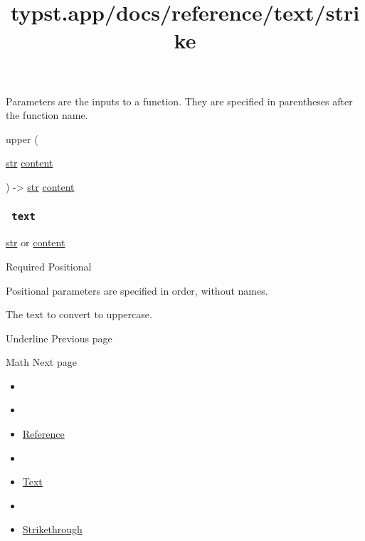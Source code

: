 \label{parameters-tooltip}
Parameters are the inputs to a function. They are specified in
parentheses after the function name.

{ upper } (

{ \href{/docs/reference/foundations/str/}{str}
\href{/docs/reference/foundations/content/}{content} }

) -\textgreater{} \href{/docs/reference/foundations/str/}{str}
\href{/docs/reference/foundations/content/}{content}

\subsubsection{\texorpdfstring{\texttt{\ text\ }}{ text }}\label{parameters-text}

\href{/docs/reference/foundations/str/}{str} {or}
\href{/docs/reference/foundations/content/}{content}

{Required} {{ Positional }}

\label{parameters-text-positional-tooltip}
Positional parameters are specified in order, without names.

The text to convert to uppercase.

\href{/docs/reference/text/underline/}{\pandocbounded{}}

{ Underline } { Previous page }

\href{/docs/reference/math/}{\pandocbounded{}}

{ Math } { Next page }


\title{typst.app/docs/reference/text/strike}

\begin{itemize}
\tightlist
\item
  \href{/docs}{}
\item
  
\item
  \href{/docs/reference/}{Reference}
\item
  
\item
  \href{/docs/reference/text/}{Text}
\item
  
\item
  \href{/docs/reference/text/strike/}{Strikethrough}
\end{itemize}

